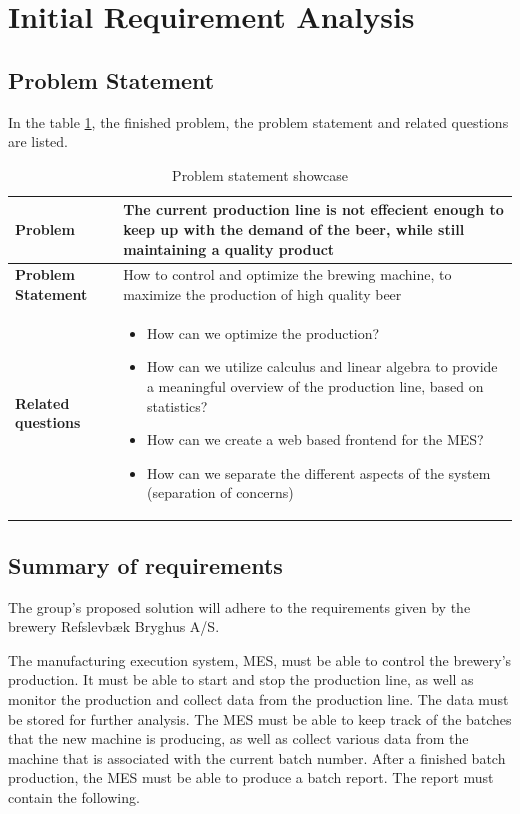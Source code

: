 \section{Initial Requirement Analysis}

\subsection{Problem Statement}
In the table \ref{table:problem-statement}, the finished problem, the problem statement and related questions are listed.
\begin{table}[ht]
    \begin{tabularx}{\textwidth}{|>{\RaggedRight}p{4cm}|>{\RaggedRight}X|}
        \hline
        \textbf{Problem} & The current production line is not effecient enough to keep up with the demand of the beer, while still maintaining a quality product\\
        \hline
        \textbf{Problem Statement} & How to control and optimize the brewing machine, to maximize the production of high quality beer\\
        \hline
        \textbf{Related questions} & 
            \begin{itemize}
                \item How can we optimize the production?
                \item How can we utilize calculus and linear algebra to provide a meaningful overview of the production line, based on statistics?
                \item How can we create a web based frontend for the MES?
                \item How can we separate the different aspects of the system (separation of concerns)
            \end{itemize}
        \\ 
        \hline
    \end{tabularx}
    \caption{Problem statement showcase} 
    \label{table:problem-statement}
\end{table} 

\subsection{Summary of requirements}
The group's proposed solution will adhere to the requirements given by the brewery Refslevbæk Bryghus A/S.

The manufacturing execution system, MES, must be able to control the brewery’s production.
It must be able to start and stop the production line,
as well as monitor the production and collect data from the production line.
The data must be stored for further analysis.
The MES must be able to keep track of the batches that the new machine is producing,
as well as collect various data from the machine that is associated with the current batch number.
After a finished batch production, the MES must be able to produce a batch report.
The report must contain the following.

